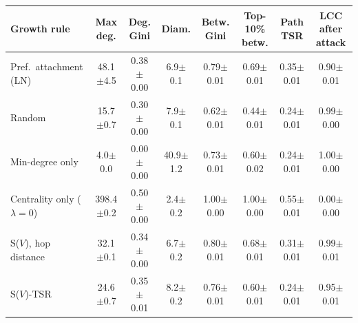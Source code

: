 \begin{tabular}{lccccccc}
\toprule
Growth rule & Max deg. & Deg. Gini & Diam. & Betw. Gini & Top-10\% betw. & Path TSR & LCC after attack \\
\midrule
Pref.\ attachment (LN) & 48.1$\pm$4.5 & 0.38$\pm$0.00 & 6.9$\pm$0.1 & 0.79$\pm$0.01 & 0.69$\pm$0.01 & 0.35$\pm$0.01 & 0.90$\pm$0.01 \\
Random & 15.7$\pm$0.7 & 0.30$\pm$0.00 & 7.9$\pm$0.1 & 0.62$\pm$0.01 & 0.44$\pm$0.01 & 0.24$\pm$0.01 & 0.99$\pm$0.00 \\
Min-degree only & 4.0$\pm$0.0 & 0.00$\pm$0.00 & 40.9$\pm$1.2 & 0.73$\pm$0.01 & 0.60$\pm$0.02 & 0.24$\pm$0.01 & 1.00$\pm$0.00 \\
Centrality only ($\lambda{=}0$) & 398.4$\pm$0.2 & 0.50$\pm$0.00 & 2.4$\pm$0.2 & 1.00$\pm$0.00 & 1.00$\pm$0.00 & 0.55$\pm$0.01 & 0.00$\pm$0.00 \\
S($V$), hop distance & 32.1$\pm$0.1 & 0.34$\pm$0.00 & 6.7$\pm$0.2 & 0.80$\pm$0.01 & 0.68$\pm$0.01 & 0.31$\pm$0.01 & 0.99$\pm$0.01 \\
S($V$)-TSR & 24.6$\pm$0.7 & 0.35$\pm$0.01 & 8.2$\pm$0.2 & 0.76$\pm$0.01 & 0.60$\pm$0.01 & 0.24$\pm$0.01 & 0.95$\pm$0.01 \\
\bottomrule
\end{tabular}
